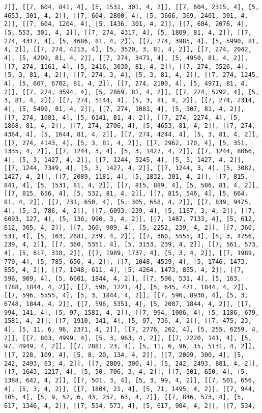 \documentclass[12pt,fleqn]{article}\usepackage{../../common}
\begin{document}
\begin{verbatim}
2]], [[7, 604, 841, 4], [5, 1531, 301, 4, 2]], [[7, 604, 2315, 4], [5, 4653, 301, 4, 2]], [[7, 604, 2800, 4], [5, 3666, 369, 2401, 301, 4, 2]], [[7, 604, 1204, 4], [5, 1436, 301, 4, 2]], [[7, 604, 2076, 4], [5, 553, 301, 4, 2]], [[7, 274, 4317, 4], [5, 1809, 81, 4, 2]], [[7, 274, 4317, 4], [5, 4686, 81, 4, 2]], [[7, 274, 3985, 4], [5, 5990, 81, 4, 2]], [[7, 274, 4213, 4], [5, 3520, 3, 81, 4, 2]], [[7, 274, 2042, 4], [5, 4299, 81, 4, 2]], [[7, 274, 3471, 4], [5, 4950, 81, 4, 2]], [[7, 274, 1161, 4], [5, 2416, 3030, 81, 4, 2]], [[7, 274, 3526, 4], [5, 3, 81, 4, 2]], [[7, 274, 3, 4], [5, 3, 81, 4, 2]], [[7, 274, 1245, 4], [5, 607, 6702, 81, 4, 2]], [[7, 274, 2100, 4], [5, 4971, 81, 4, 2]], [[7, 274, 3594, 4], [5, 2869, 81, 4, 2]], [[7, 274, 5292, 4], [5, 3, 81, 4, 2]], [[7, 274, 5144, 4], [5, 3, 81, 4, 2]], [[7, 274, 2314, 4], [5, 5499, 81, 4, 2]], [[7, 274, 1081, 4], [5, 307, 81, 4, 2]], [[7, 274, 1081, 4], [5, 6141, 81, 4, 2]], [[7, 274, 2274, 4], [5, 1868, 81, 4, 2]], [[7, 274, 2706, 4], [5, 4653, 81, 4, 2]], [[7, 274, 4364, 4], [5, 1644, 81, 4, 2]], [[7, 274, 4244, 4], [5, 3, 81, 4, 2]], [[7, 274, 4143, 4], [5, 3, 81, 4, 2]], [[7, 2962, 170, 4], [5, 351, 1335, 4, 2]], [[7, 1244, 3, 4], [5, 3, 1427, 4, 2]], [[7, 1244, 8066, 4], [5, 3, 1427, 4, 2]], [[7, 1244, 5245, 4], [5, 3, 1427, 4, 2]], [[7, 1244, 7349, 4], [5, 3, 1427, 4, 2]], [[7, 1244, 3, 4], [5, 3082, 1427, 4, 2]], [[7, 2089, 1181, 4], [5, 1832, 301, 4, 2]], [[7, 815, 841, 4], [5, 1531, 81, 4, 2]], [[7, 815, 889, 4], [5, 586, 81, 4, 2]], [[7, 815, 656, 4], [5, 532, 81, 4, 2]], [[7, 815, 546, 4], [5, 664, 81, 4, 2]], [[7, 731, 650, 4], [5, 305, 658, 4, 2]], [[7, 839, 9475, 4], [5, 3, 786, 4, 2]], [[7, 6093, 239, 4], [5, 1167, 3, 4, 2]], [[7, 6093, 127, 4], [5, 136, 990, 3, 4, 2]], [[7, 1487, 7133, 4], [5, 612, 612, 365, 4, 2]], [[7, 360, 909, 4], [5, 2252, 239, 4, 2]], [[7, 360, 531, 4], [5, 163, 2681, 239, 4, 2]], [[7, 360, 5555, 4], [5, 3, 4756, 239, 4, 2]], [[7, 360, 5351, 4], [5, 3153, 239, 4, 2]], [[7, 561, 573, 4], [5, 617, 318, 2]], [[7, 1989, 1737, 4], [5, 3, 4, 2]], [[7, 1989, 779, 4], [5, 785, 656, 4, 2]], [[7, 1048, 4539, 4], [5, 1746, 1473, 855, 4, 2]], [[7, 1048, 611, 4], [5, 4264, 1473, 855, 4, 2]], [[7, 596, 909, 4], [5, 6601, 1844, 4, 2]], [[7, 596, 531, 4], [5, 163, 1788, 1844, 4, 2]], [[7, 596, 1221, 4], [5, 645, 471, 1844, 4, 2]], [[7, 596, 5555, 4], [5, 3, 1844, 4, 2]], [[7, 596, 8930, 4], [5, 3, 6748, 1844, 4, 2]], [[7, 596, 5351, 4], [5, 2007, 1844, 4, 2]], [[7, 994, 141, 4], [5, 97, 1581, 4, 2]], [[7, 994, 1006, 4], [5, 1186, 679, 1581, 4, 2]], [[7, 1910, 141, 4], [5, 97, 736, 4, 2]], [[7, 475, 23, 4], [5, 11, 6, 96, 2371, 4, 2]], [[7, 2776, 262, 4], [5, 255, 6259, 4, 2]], [[7, 803, 4999, 4], [5, 3, 963, 4, 2]], [[7, 2220, 141, 4], [5, 97, 4949, 4, 2]], [[7, 2881, 23, 4], [5, 11, 6, 96, 15, 5131, 4, 2]], [[7, 228, 109, 4], [5, 8, 20, 134, 4, 2]], [[7, 2009, 300, 4], [5, 242, 2493, 63, 4, 2]], [[7, 2009, 300, 4], [5, 242, 2493, 881, 4, 2]], [[7, 1643, 1217, 4], [5, 50, 706, 3, 4, 2]], [[7, 501, 650, 4], [5, 1388, 642, 4, 2]], [[7, 501, 3, 4], [5, 3, 99, 4, 2]], [[7, 501, 656, 4], [5, 3, 4, 2]], [[7, 1804, 21, 4], [5, 71, 1495, 4, 2]], [[7, 944, 105, 4], [5, 9, 52, 6, 43, 257, 63, 4, 2]], [[7, 846, 573, 4], [5, 617, 1346, 4, 2]], [[7, 534, 573, 4], [5, 617, 904, 4, 2]], [[7, 534, 
\end{verbatim}
\end{document}
